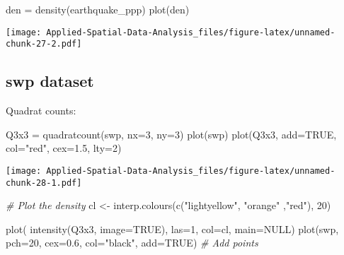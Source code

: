 \documentclass[
]{book}
\newenvironment{Shaded}{\begin{snugshade}}{\end{snugshade}}
\newcommand{\AttributeTok}[1]{\textcolor[rgb]{0.77,0.63,0.00}{#1}}
\newcommand{\CommentTok}[1]{\textcolor[rgb]{0.56,0.35,0.01}{\textit{#1}}}
\newcommand{\ConstantTok}[1]{\textcolor[rgb]{0.00,0.00,0.00}{#1}}
\newcommand{\DecValTok}[1]{\textcolor[rgb]{0.00,0.00,0.81}{#1}}
\newcommand{\FloatTok}[1]{\textcolor[rgb]{0.00,0.00,0.81}{#1}}
\newcommand{\FunctionTok}[1]{\textcolor[rgb]{0.00,0.00,0.00}{#1}}
\newcommand{\NormalTok}[1]{#1}
\newcommand{\OtherTok}[1]{\textcolor[rgb]{0.56,0.35,0.01}{#1}}
\newcommand{\StringTok}[1]{\textcolor[rgb]{0.31,0.60,0.02}{#1}}
\begin{document}
\begin{Shaded}
\begin{Highlighting}[]
\NormalTok{den }\OtherTok{=} \FunctionTok{density}\NormalTok{(earthquake\_ppp)}
\FunctionTok{plot}\NormalTok{(den)}
\end{Highlighting}
\end{Shaded}

\texttt{[image: Applied-Spatial-Data-Analysis\_files/figure-latex/unnamed-chunk-27-2.pdf]}

\hypertarget{swp-dataset}{%
\subsection{swp dataset}\label{swp-dataset}}

Quadrat counts:

\begin{Shaded}
\begin{Highlighting}[]
\NormalTok{Q3x3 }\OtherTok{=} \FunctionTok{quadratcount}\NormalTok{(swp, }\AttributeTok{nx=}\DecValTok{3}\NormalTok{, }\AttributeTok{ny=}\DecValTok{3}\NormalTok{)}
\FunctionTok{plot}\NormalTok{(swp)}
\FunctionTok{plot}\NormalTok{(Q3x3, }\AttributeTok{add=}\ConstantTok{TRUE}\NormalTok{, }\AttributeTok{col=}\StringTok{"red"}\NormalTok{, }\AttributeTok{cex=}\FloatTok{1.5}\NormalTok{, }\AttributeTok{lty=}\DecValTok{2}\NormalTok{)}
\end{Highlighting}
\end{Shaded}

\texttt{[image: Applied-Spatial-Data-Analysis\_files/figure-latex/unnamed-chunk-28-1.pdf]}

\begin{Shaded}
\begin{Highlighting}[]
\CommentTok{\# Plot the density}
\NormalTok{cl }\OtherTok{\textless{}{-}}  \FunctionTok{interp.colours}\NormalTok{(}\FunctionTok{c}\NormalTok{(}\StringTok{"lightyellow"}\NormalTok{, }\StringTok{"orange"}\NormalTok{ ,}\StringTok{"red"}\NormalTok{), }\DecValTok{20}\NormalTok{)}

\FunctionTok{plot}\NormalTok{( }\FunctionTok{intensity}\NormalTok{(Q3x3, }\AttributeTok{image=}\ConstantTok{TRUE}\NormalTok{), }\AttributeTok{las=}\DecValTok{1}\NormalTok{, }\AttributeTok{col=}\NormalTok{cl, }\AttributeTok{main=}\ConstantTok{NULL}\NormalTok{)}
\FunctionTok{plot}\NormalTok{(swp, }\AttributeTok{pch=}\DecValTok{20}\NormalTok{, }\AttributeTok{cex=}\FloatTok{0.6}\NormalTok{, }\AttributeTok{col=}\StringTok{"black"}\NormalTok{, }\AttributeTok{add=}\ConstantTok{TRUE}\NormalTok{)  }\CommentTok{\# Add points}
\end{Highlighting}
\end{Shaded}
\end{document}
